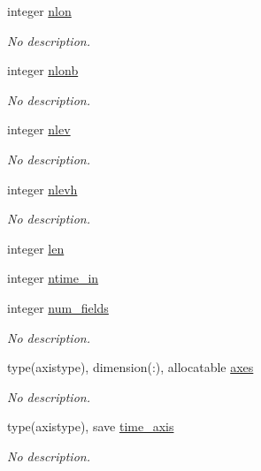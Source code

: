 \begin{DoxyCompactItemize}
integer \hyperlink{namespaceinterpolator__mod_aafdc4f93d71e9667b386450b5fb59744}{nlon}
\begin{DoxyCompactList}\small\item\em No description. \end{DoxyCompactList}\item 
integer \hyperlink{namespaceinterpolator__mod_a312469d5e5202ee51d387b17734558c8}{nlonb}
\begin{DoxyCompactList}\small\item\em No description. \end{DoxyCompactList}\item 
integer \hyperlink{namespaceinterpolator__mod_a6037a0a4085094164b9a85965c842487}{nlev}
\begin{DoxyCompactList}\small\item\em No description. \end{DoxyCompactList}\item 
integer \hyperlink{namespaceinterpolator__mod_a5549db03f23ee2af91ba95d80f0d6599}{nlevh}
\begin{DoxyCompactList}\small\item\em No description. \end{DoxyCompactList}\item 
integer \hyperlink{namespaceinterpolator__mod_a6bd2ec3395203e1b6aba0610bfbfe16b}{len}
\item 
integer \hyperlink{namespaceinterpolator__mod_abaac223c7892bb4d462ab19a4bceb560}{ntime\+\_\+in}
\item 
integer \hyperlink{namespaceinterpolator__mod_a1c104400d854c0e697b5c45acd77a142}{num\+\_\+fields}
\begin{DoxyCompactList}\small\item\em No description. \end{DoxyCompactList}\item 
type(axistype), dimension(\+:), allocatable \hyperlink{namespaceinterpolator__mod_aff9153472fc8b4a3382cba78b8c2dc19}{axes}
\begin{DoxyCompactList}\small\item\em No description. \end{DoxyCompactList}\item 
type(axistype), save \hyperlink{namespaceinterpolator__mod_a2b93f7d5634aaa2389326983a7f4833f}{time\+\_\+axis}
\begin{DoxyCompactList}\small\item\em No description. \end{DoxyCompactList}\item 

\end{DoxyCompactItemize}
